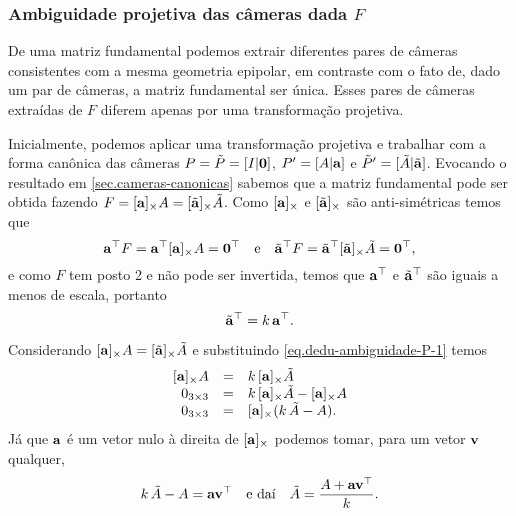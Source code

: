 \subsubsection{Ambiguidade projetiva das câmeras dada $F$}\label{sec.ambi-cameras-dada-F}

De uma matriz fundamental podemos extrair diferentes pares de câmeras consistentes com a mesma geometria epipolar, em contraste com o fato de, dado um par de câmeras, a matriz fundamental ser única. Esses pares de câmeras extraídas de $F$ diferem apenas por uma transformação projetiva.

Inicialmente, podemos aplicar uma transformação projetiva e trabalhar com a forma canônica das câmeras $P=\tilde{P}=[I|{\bf 0}]$, $P'=[A|{\bf a}]$ e $\tilde{P}'=[\tilde{A}|\tilde{{\bf a}}]$. Evocando o resultado em \ref{sec.cameras-canonicas} sabemos que a matriz fundamental pode ser obtida fazendo 
$F=[{\bf a}]_{\times} A=[\tilde{{\bf a}}]_{\times} \tilde{A}$. Como $[{\bf a}]_{\times}$ e $[\tilde{{\bf a}}]_{\times}$ são anti-simétricas temos que
\begin{equation*}
{\bf a}^\top F={\bf a}^\top [{\bf a}]_{\times} A={\bf 0}^\top\quad\text{e}\quad\tilde{{\bf a}}^\top F=\tilde{{\bf a}}^\top [\tilde{{\bf a}}]_{\times} \tilde{A}={\bf 0}^\top,
\end{equation*}
e como $F$ tem posto 2 e não pode ser invertida, temos que ${\bf a}^\top$ e ${\tilde{{\bf a}}^\top}$ são iguais a menos de escala, portanto
\begin{equation}\label{eq.dedu-ambiguidade-P-1}
{\tilde{{\bf a}}^\top}=k\,{\bf a}^\top.
\end{equation}

Considerando $[{\bf a}]_{\times} A=[\tilde{{\bf a}}]_{\times} \tilde{A}$ e substituindo \ref{eq.dedu-ambiguidade-P-1} temos
\begin{equation*}
\begin{array}{rcl}
[{\bf a}]_{\times} A&=&k\,[{\bf a}]_{\times} \tilde{A}\\
0_{3\times3}&=&k\,[{\bf a}]_{\times} \tilde{A}-[{\bf a}]_{\times} A\\
0_{3\times3}&=&[{\bf a}]_{\times}(k\,\tilde{A}-A).
\end{array}
\end{equation*}
Já que ${\bf a}$ é um vetor nulo à direita de $[{\bf a}]_{\times}$ podemos tomar, para um vetor ${\bf v}$ qualquer,
\begin{equation}\label{eq.dedu-ambiguidade-P-2}
k\,\tilde{A}-A={\bf a}{\bf v}^\top\quad\text{e daí}\quad \tilde{A}=\frac{A+{\bf a}{\bf v}^\top}{k}. 
\end{equation}

